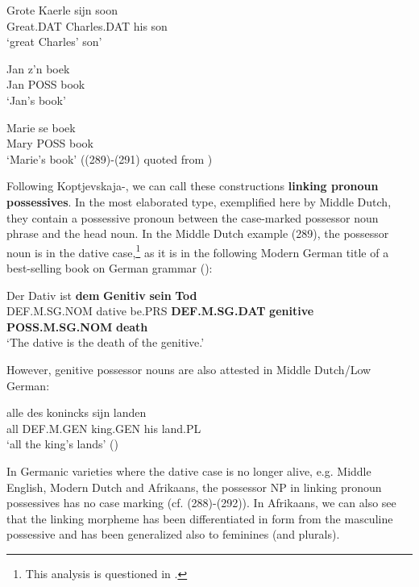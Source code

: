 {{\ea\label{}
\gll Grote  Kaerle  sijn  soon\\
Great.DAT  Charles.DAT  his  son\\
\glt ‘great Charles’ son’
\z

\ea\label{}
\gll Jan  z’n  boek\\
Jan  POSS   book\\
\glt ‘Jan’s book’
\z

\ea\label{}
\gll Marie  se  boek\\
Mary  POSS  book\\
\glt ‘Marie’s book’ ((289){}-(291) quoted from \citet[56]{Norde1997})
\z

Following Koptjevskaja-\citet{Tamm2003}, we can call these constructions \textbf{linking pronoun possessives}. In the most elaborated type, exemplified here by Middle Dutch, they contain a possessive pronoun between the case-marked possessor noun phrase and the head noun. In the Middle Dutch example (289), the possessor noun is in the dative case,\footnote{ This analysis is questioned in \citet{Allen2008}.} as it is in the following Modern German title of a best-selling book on German grammar (\citet{Sick2004}):


\ea\label{}
\gll Der  Dativ  ist  \textbf{dem}\textbf{  Genitiv}\textbf{  sein}\textbf{  Tod}\\
DEF.M.SG.NOM  dative  be.PRS  \textbf{DEF.M.SG.DAT} \textbf{genitive} \textbf{POSS.M.SG.NOM} \textbf{death}\\
\glt  ‘The dative is the death of the genitive.’
\z

 However, genitive possessor nouns are also attested in Middle Dutch/Low German:


\ea\label{}
\gll alle  des  konincks  sijn  landen\\
all  DEF.M.GEN  king.GEN  his  land.PL\\
\glt ‘all the king’s lands’ (\citet[58]{Norde1997})
\z

In Germanic varieties where the dative case is no longer alive, e.g. Middle English, Modern Dutch and Afrikaans, the possessor NP in linking pronoun possessives has no case marking (cf. (288){}-(292)). In Afrikaans, we can also see that the linking morpheme  has been differentiated in form from the masculine possessive  and has been generalized also to feminines (and plurals).

}}
